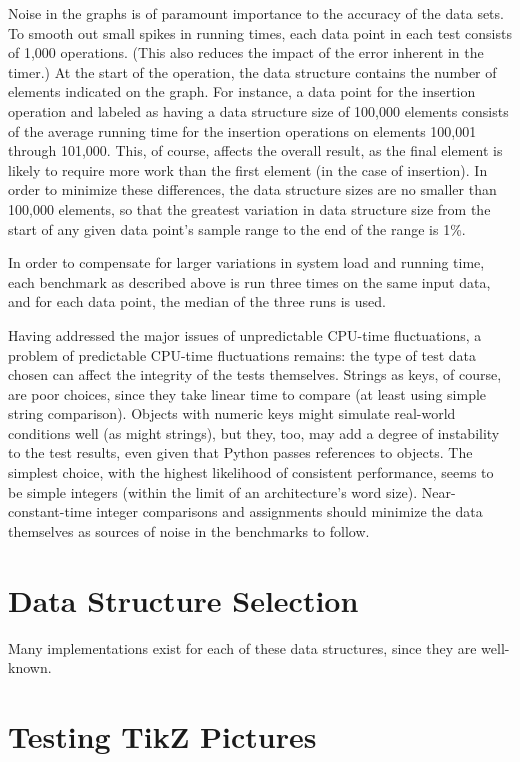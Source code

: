 \documentclass{article}
\begin{document}
Noise in the graphs is of paramount importance to the accuracy of the data sets. To smooth out small spikes in running times, each data point in each test consists of 1,000 operations. (This also reduces the impact of the error inherent in the timer.) At the start of the operation, the data structure contains the number of elements indicated on the graph. For instance, a data point for the insertion operation and labeled as having a data structure size of 100,000 elements consists of the average running time for the insertion operations on elements 100,001 through 101,000. This, of course, affects the overall result, as the final element is likely to require more work than the first element (in the case of insertion). In order to minimize these differences, the data structure sizes are no smaller than 100,000 elements, so that the greatest variation in data structure size from the start of any given data point's sample range to the end of the range is 1\%.

In order to compensate for larger variations in system load and running time, each benchmark as described above is run three times on the same input data, and for each data point, the median of the three runs is used.

Having addressed the major issues of unpredictable CPU-time fluctuations, a problem of predictable CPU-time fluctuations remains: the type of test data chosen can affect the integrity of the tests themselves. Strings as keys, of course, are poor choices, since they take linear time to compare (at least using simple string comparison). Objects with numeric keys might simulate real-world conditions well (as might strings), but they, too, may add a degree of instability to the test results, even given that Python passes references to objects. The simplest choice, with the highest likelihood of consistent performance, seems to be simple integers (within the limit of an architecture's word size). Near-constant-time integer comparisons and assignments should minimize the data themselves as sources of noise in the benchmarks to follow.

\section{Data Structure Selection}
Many implementations exist for each of these data structures, since they are well-known. 

\newpage
\section{Testing TikZ Pictures}


\end{document}
